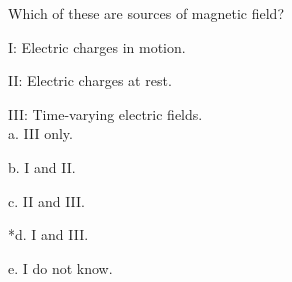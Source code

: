 
Which of these are sources of magnetic field?

I: Electric charges in motion.

II: Electric charges at rest.

III: Time-varying electric fields.\\

a. III only.

b. I and II.

c. II and III.

*d. I and III.

e. I do not know.\\
